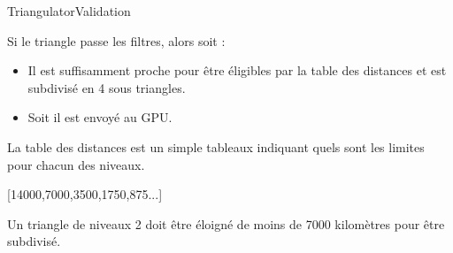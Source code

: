 \documentclass[french]{beamer}
\begin{document}
 \begin{frame}{Triangulator}{Validation}
     

Si le triangle passe les filtres, alors soit :
\begin{itemize}
    \item Il est suffisamment proche pour être éligibles par la table des distances et est subdivisé en 4 sous triangles.
    \item Soit il est envoyé au GPU.
\end{itemize}

La table des distances est un simple tableaux indiquant quels sont les limites pour chacun des niveaux.
\newline

[14000,7000,3500,1750,875...]
\newline

Un triangle de niveaux 2 doit être éloigné de moins de 7000 kilomètres pour être subdivisé. 
\label{fig:my_label}

 \end{frame}
 
\end{document}

